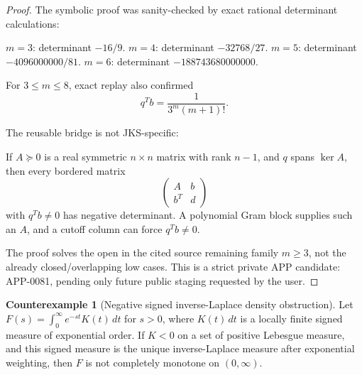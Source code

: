 \documentclass[11pt]{article}
\numberwithin{equation}{section}
\theoremstyle{definition}
\newtheorem{counterexample}[theorem]{Counterexample}
\theoremstyle{remark}
\newcommand{\1}{\mathbf 1}
\begin{document}
\begin{proof}
The symbolic proof was sanity-checked by exact rational determinant
calculations:

\(m=3\): determinant \(-16/9\).
\(m=4\): determinant \(-32768/27\).
\(m=5\): determinant \(-4096000000/81\).
\(m=6\): determinant \(-188743680000000\).

For \(3\le m\le8\), exact replay also confirmed
\[
q^T b=\frac{1}{3^m(m+1)!}.
\]

The reusable bridge is not JKS-specific:

If \(A\succeq0\) is a real symmetric \(n\times n\) matrix with rank \(n-1\),
and \(q\) spans \(\ker A\), then every bordered matrix
\[
\begin{pmatrix}A&b\\ b^T&d\end{pmatrix}
\]
with \(q^T b\ne0\) has negative determinant. A polynomial Gram block supplies
such an \(A\), and a cutoff column can force \(q^T b\ne0\).

The proof solves the open in the cited source remaining family \(m\ge3\), not the already
closed/overlapping low cases. This is a strict private APP candidate:
APP-0081, pending only future public staging requested by the user.
\end{proof}

\begin{counterexample}[Negative signed inverse-Laplace density obstruction]
\label{res:signedinverselaplace-density-negativity-obstruction}
Let \(F(s)=\int_0^\infty e^{-st}K(t)\,dt\) for \(s>0\), where \(K(t)\,dt\) is a locally finite signed measure of exponential order. If \(K<0\) on a set of positive Lebesgue measure, and this signed measure is the unique inverse-Laplace measure after exponential weighting, then \(F\) is not completely monotone on \((0,\infty)\).
\end{counterexample}
\end{document}
